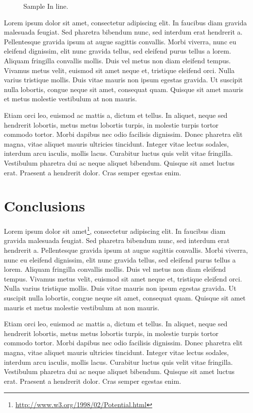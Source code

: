 \begin{wrapfigure}{l}{0.5\textwidth}
  \begin{center}
		{}
		\caption{Sample In line.}
	\end{center}
\label{fig:InlineSample}
\end{wrapfigure}

 Lorem ipsum dolor sit amet, consectetur adipiscing elit. In faucibus diam gravida malesuada feugiat. Sed pharetra bibendum nunc, sed interdum erat hendrerit a. Pellentesque gravida ipsum at augue sagittis convallis. Morbi viverra, nunc eu eleifend dignissim, elit nunc gravida tellus, sed eleifend purus tellus a lorem. Aliquam fringilla convallis mollis. Duis vel metus non diam eleifend tempus. Vivamus metus velit, euismod sit amet neque et, tristique eleifend orci. Nulla varius tristique mollis. Duis vitae mauris non ipsum egestas gravida. Ut suscipit nulla lobortis, congue neque sit amet, consequat quam. Quisque sit amet mauris et metus molestie vestibulum at non mauris.

Etiam orci leo, euismod ac mattis a, dictum et tellus. In aliquet, neque sed hendrerit lobortis, metus metus lobortis turpis, in molestie turpis tortor commodo tortor. Morbi dapibus nec odio facilisis dignissim. Donec pharetra elit magna, vitae aliquet mauris ultricies tincidunt. Integer vitae lectus sodales, interdum arcu iaculis, mollis lacus. Curabitur luctus quis velit vitae fringilla. Vestibulum pharetra dui ac neque aliquet bibendum. Quisque sit amet luctus erat. Praesent a hendrerit dolor. Cras semper egestas enim. 


\section{Conclusions}

Lorem ipsum dolor sit amet\footnote{\url{http://www.w3.org/1998/02/Potential.html}}, consectetur adipiscing elit. In faucibus diam gravida malesuada feugiat. Sed pharetra bibendum nunc, sed interdum erat hendrerit a. Pellentesque gravida ipsum at augue sagittis convallis. Morbi viverra, nunc eu eleifend dignissim, elit nunc gravida tellus, sed eleifend purus tellus a lorem. Aliquam fringilla convallis mollis. Duis vel metus non diam eleifend tempus. Vivamus metus velit, euismod sit amet neque et, tristique eleifend orci. Nulla varius tristique mollis. Duis vitae mauris non ipsum egestas gravida. Ut suscipit nulla lobortis, congue neque sit amet, consequat quam. Quisque sit amet mauris et metus molestie vestibulum at non mauris.

Etiam orci leo, euismod ac mattis a, dictum et tellus. In aliquet, neque sed hendrerit lobortis, metus metus lobortis turpis, in molestie turpis tortor commodo tortor. Morbi dapibus nec odio facilisis dignissim. Donec pharetra elit magna, vitae aliquet mauris ultricies tincidunt. Integer vitae lectus sodales, interdum arcu iaculis, mollis lacus. Curabitur luctus quis velit vitae fringilla. Vestibulum pharetra dui ac neque aliquet bibendum. Quisque sit amet luctus erat. Praesent a hendrerit dolor. Cras semper egestas enim. 
